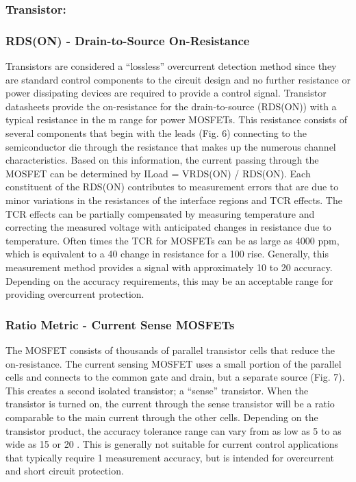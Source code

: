 \documentclass[12pt,a4paper,titlepage,openany]{report}
\begin{document}
\subsubsection{Transistor:}
\subsubsection{RDS(ON) - Drain-to-Source On-Resistance}


Transistors are considered a “lossless” overcurrent detection method since they are standard control components to the circuit
design and no further resistance or power dissipating devices are required to provide a control signal. Transistor datasheets
provide the on-resistance for the drain-to-source (RDS(ON)) with a typical resistance in the m range for power MOSFETs. This
resistance consists of several components that begin with the leads (Fig. 6) connecting to the semiconductor die through the
resistance that makes up the numerous channel characteristics. Based on this information, the current passing through the
MOSFET can be determined by ILoad = VRDS(ON) / RDS(ON).
Each constituent of the RDS(ON) contributes to measurement errors that are due to minor variations in the resistances of the
interface regions and TCR effects. The TCR effects can be partially compensated by measuring temperature and correcting the
measured voltage with anticipated changes in resistance due to temperature. Often times the TCR for MOSFETs can be as large
as 4000 ppm, which is equivalent to a 40  change in resistance for a 100  rise. Generally, this measurement method
provides a signal with approximately 10  to 20  accuracy. Depending on the accuracy requirements, this may be an
acceptable range for providing overcurrent protection.

\subsubsection{Ratio Metric - Current Sense MOSFETs}
The MOSFET consists of thousands of parallel transistor cells that reduce the on-resistance. The current sensing MOSFET uses
a small portion of the parallel cells and connects to the common gate and drain, but a separate source (Fig. 7). This creates a
second isolated transistor; a “sense” transistor. When the transistor is turned on, the current through the sense transistor will
be a ratio comparable to the main current through the other cells.
Depending on the transistor product, the accuracy tolerance range can vary from as low as 5  to as wide as 15  or 20 .
This is generally not suitable for current control applications that typically require 1  measurement accuracy, but is intended
for overcurrent and short circuit protection.
\end{document}
